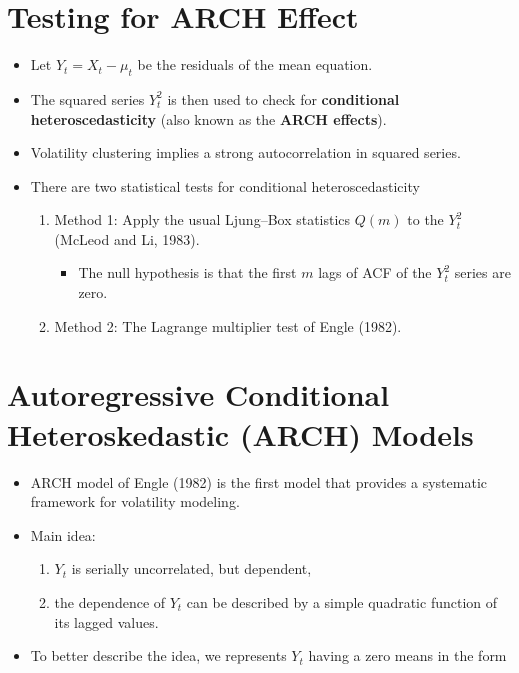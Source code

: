 \documentclass[]{book}
\providecommand{\tightlist}{%
  \setlength{\itemsep}{0pt}\setlength{\parskip}{0pt}}
\begin{document}
\hypertarget{testing-for-arch-effect}{%
\section{Testing for ARCH Effect}\label{testing-for-arch-effect}}

\begin{itemize}
\tightlist
\item
  Let \(Y_t = X_t − \mu_t\) be the residuals of the mean equation.
\item
  The squared series \(Y_t^2\) is then used to check for \textbf{conditional heteroscedasticity} (also known as the \textbf{ARCH effects}).
\item
  Volatility clustering implies a strong autocorrelation in squared series.
\item
  There are two statistical tests for conditional heteroscedasticity

  \begin{enumerate}
  \def\labelenumi{\arabic{enumi}.}
  \item
    Method 1: Apply the usual Ljung--Box statistics \(Q(m)\) to the \(Y_t^2\) (McLeod and Li, 1983).

    \begin{itemize}
    \tightlist
    \item
      The null hypothesis is that the first \(m\) lags of ACF of the \(Y_t^2\) series are zero.
    \end{itemize}
  \item
    Method 2: The Lagrange multiplier test of Engle (1982).
  \end{enumerate}
\end{itemize}

\hypertarget{autoregressive-conditional-heteroskedastic-arch-models}{%
\section{Autoregressive Conditional Heteroskedastic (ARCH) Models}\label{autoregressive-conditional-heteroskedastic-arch-models}}

\begin{itemize}
\item
  ARCH model of Engle (1982) is the first model that provides a systematic framework for volatility modeling.
\item
  Main idea:

  \begin{enumerate}
  \def\labelenumi{(\alph{enumi})}
  \tightlist
  \item
    \(Y_t\) is serially uncorrelated, but dependent,\\
  \item
    the dependence of \(Y_t\) can be described by a simple quadratic function of its lagged values.
  \end{enumerate}
\item
  To better describe the idea, we represents \(Y_t\) having a zero means in the form
\end{itemize}
\end{document}
